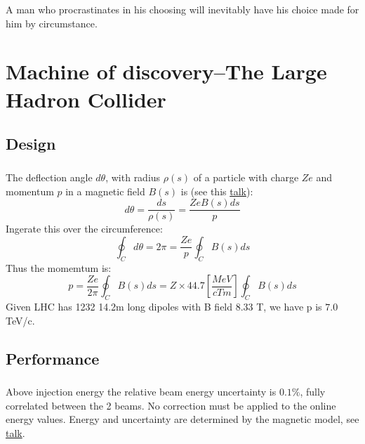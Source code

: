 \begin{savequote}[75mm]
A man who procrastinates in his choosing will inevitably have his choice made for him by circumstance.
\end{savequote}

\chapter{Machine of discovery--The Large Hadron Collider}

\section{Design}
\paragraph{}
The deflection angle $d\theta$, with radius $\rho(s)$ of a particle with charge $Ze$ and momentum $p$ in a magnetic field $B(s)$ is (see this \href{https://indico.cern.ch/event/626458/contributions/2529616/attachments/1434511/2205263/LHC-Ecal.ATLAS-plenary.Mar17.pdf}{talk}):
\begin{equation}
d\theta = \frac{ds}{\rho(s)} = \frac{ZeB(s)ds}{p}
\end{equation}
Ingerate this over the circumference:
\begin{equation}
\oint_C d\theta = 2\pi = \frac{Ze}{p} \oint_C B(s)ds
\end{equation}
Thus the momemtum is:
\begin{equation}
p = \frac{Ze}{2\pi}\oint_C B(s)ds = Z \times 44.7[\frac{MeV}{cTm}] \oint_C B(s)ds
\end{equation}
Given LHC has 1232 14.2m long dipoles with B field 8.33 T, we have p is $7.0$ TeV/c.

\section{Performance}
\paragraph{} 
Above injection energy the relative beam energy uncertainty is $0.1\%$, fully correlated between the 2 beams. No correction must be applied to the online energy values. Energy and uncertainty are determined by the magnetic model, see \href{https://indico.cern.ch/event/626458/contributions/2529616/attachments/1434511/2205263/LHC-Ecal.ATLAS-plenary.Mar17.pdf}{talk}.
